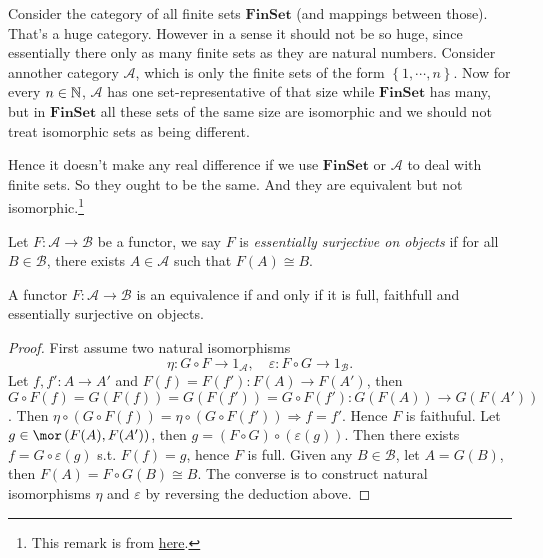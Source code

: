   \begin{remark}
    Consider the category of all finite sets $\mathbf{FinSet}$ (and mappings between those). That's a huge category. However in a sense it should not be so huge, since essentially there only as many finite sets as they are natural numbers. Consider annother category $\mathscr{A}$, which is only the finite sets of the form $\left\{1,\cdots ,n\right\} $. Now for every $n\in \mathbb{N}$, $\mathscr{A}$ has one set-representative of that size while $\mathbf{FinSet}$ has many, but in $\mathbf{FinSet}$ all these sets of the same size are isomorphic and we should not treat isomorphic sets as being different.

    Hence it doesn't make any real difference if we use $\mathbf{FinSet}$ or  $\mathscr{A}$ to deal with finite sets. So they ought to be the same. And they are equivalent but not isomorphic.\footnote{This remark is from \href{https://math.stackechange.com/questions/2761653/why-is-equivalence-of-functiors-defined-differently-from-the-equivalence-of-categ}{here}.}
  \end{remark}

  \begin{definition}
    Let $F:\mathscr{A}\to \mathscr{B}$ be a functor, we say $F$ is \textit{essentially surjective on objects} if for all $B \in \mathscr{B}$, there exists $A \in \mathscr{A}$ such that $F(A)\cong B$.
  \end{definition}
  
  \begin{proposition}
    A functor $F:\mathscr{A}\to \mathscr{B}$ is an equivalence if and only if it is full, faithfull and essentially surjective on objects.
  \end{proposition}
  \begin{proof}
    First assume two natural isomorphisms
    \[
    \eta :G\circ F\to 1_{\mathscr{A}},\quad \varepsilon :F\circ G\to 1_{\mathscr{B}}.
    \] 
    Let $f,f':A\to A'$ and $F(f)=F(f'):F(A)\to F(A')$, then  $G\circ F(f)=G(F(f))=G(F(f'))=G\circ F(f'):G(F(A))\to G\left( F(A') \right) $. Then $\eta\circ \left( G\circ F(f) \right)=\eta\circ \left( G\circ F (f') \right) \Rightarrow f=f' $. Hence $F$ is faithuful. 
    Let $g \in \mor \left( F(A),F(A') \right) $, then $g= \left( F\circ G \right)\circ \left(\varepsilon (g)\right) $. Then there exists $f=G\circ \varepsilon (g)$ s.t. $F(f)=g$, hence $F$ is full. Given any $B \in \mathscr{B}$, let $A=G(B)$, then $F(A)=F\circ G(B)\cong B$. The converse is to construct natural isomorphisms  $\eta$ and $\varepsilon $ by reversing the deduction above.
  \end{proof}

